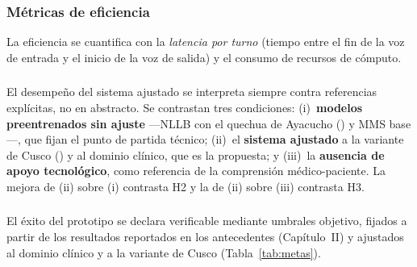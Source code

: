 \subsubsection{M{\'e}tricas de eficiencia}
La eficiencia se cuantifica con la \emph{latencia por turno} (tiempo entre el fin de la voz de
entrada y el inicio de la voz de salida) y el consumo de recursos de c{\'o}mputo.

\subsubsection{}
\begin{bloqueObsCuatro}
\noindent El desempe{\~n}o del sistema ajustado se interpreta siempre contra referencias expl{\'i}citas,
no en abstracto. Se contrastan tres condiciones: (i)~\textbf{modelos preentrenados sin ajuste}
---NLLB con el quechua de Ayacucho () y MMS base---, que fijan el punto de partida t{\'e}cnico;
(ii)~el \textbf{sistema ajustado} a la variante de Cusco () y al dominio cl{\'i}nico, que es
la propuesta; y (iii)~la \textbf{ausencia de apoyo tecnol{\'o}gico}, como referencia de la
comprensi{\'o}n m{\'e}dico-paciente. La mejora de (ii) sobre (i) contrasta H2 y la de (ii) sobre (iii)
contrasta H3.
\end{bloqueObsCuatro}

\subsubsection{}
\begin{bloqueObsCuatro}
\noindent El {\'e}xito del prototipo se declara verificable mediante umbrales objetivo, fijados a
partir de los resultados reportados en los antecedentes (Cap{\'i}tulo~II) y ajustados al dominio
cl{\'i}nico y a la variante de Cusco (Tabla~\ref{tab:metas}).
\end{bloqueObsCuatro}

